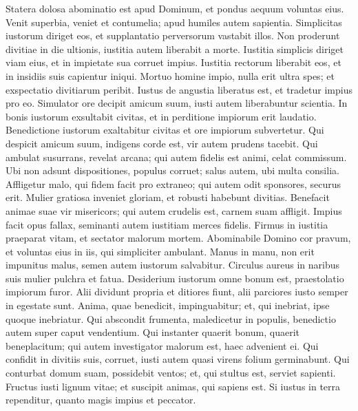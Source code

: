 \begin{biblechapter}
\begin{biblechapter}
\begin{biblechapter}
\begin{biblechapter}
\begin{biblechapter}
\begin{biblechapter}
\begin{biblechapter}
\begin{biblechapter}
\begin{biblechapter}
\begin{biblechapter}
\begin{biblechapter}
 \verse Statera dolosa abominatio est apud Dominum,
 et pondus aequum voluntas eius.
 \verse Venit superbia, veniet et contumelia;
 apud humiles autem sapientia.
 \verse Simplicitas iustorum diriget eos,
 et supplantatio perversorum vastabit illos.
 \verse Non proderunt divitiae in die ultionis,
 iustitia autem liberabit a morte.
 \verse Iustitia simplicis diriget viam eius,
 et in impietate sua corruet impius.
 \verse Iustitia rectorum liberabit eos,
 et in insidiis suis capientur iniqui.
 \verse Mortuo homine impio, nulla erit ultra spes;
 et exspectatio divitiarum peribit.
 \verse Iustus de angustia liberatus est,
 et tradetur impius pro eo.
 \verse Simulator ore decipit amicum suum,
 iusti autem liberabuntur scientia.
 \verse In bonis iustorum exsultabit civitas,
 et in perditione impiorum erit laudatio.
 \verse Benedictione iustorum exaltabitur civitas
 et ore impiorum subvertetur.
 \verse Qui despicit amicum suum, indigens corde est,
 vir autem prudens tacebit.
 \verse Qui ambulat susurrans, revelat arcana;
 qui autem fidelis est animi, celat commissum.
 \verse Ubi non adsunt dispositiones, populus corruet;
 salus autem, ubi multa consilia.
 \verse Affligetur malo, qui fidem facit pro extraneo;
 qui autem odit sponsores, securus erit.
 \verse Mulier gratiosa inveniet gloriam,
 et robusti habebunt divitias.
 \verse Benefacit animae suae vir misericors;
 qui autem crudelis est, carnem suam affligit.
 \verse Impius facit opus fallax,
 seminanti autem iustitiam merces fidelis.
 \verse Firmus in iustitia praeparat vitam,
 et sectator malorum mortem.
 \verse Abominabile Domino cor pravum,
 et voluntas eius in iis, qui simpliciter ambulant.
 \verse Manus in manu, non erit impunitus malus,
 semen autem iustorum salvabitur.
 \verse Circulus aureus in naribus suis
 mulier pulchra et fatua.
 \verse Desiderium iustorum omne bonum est,
 praestolatio impiorum furor.
 \verse Alii dividunt propria et ditiores fiunt,
 alii parciores iusto semper in egestate sunt.
 \verse Anima, quae benedicit, impinguabitur;
 et, qui inebriat, ipse quoque inebriatur.
 \verse Qui abscondit frumenta, maledicetur in populis,
 benedictio autem super caput vendentium.
 \verse Qui instanter quaerit bonum, quaerit beneplacitum;
 qui autem investigator malorum est, haec advenient ei.
 \verse Qui confidit in divitiis suis, corruet,
 iusti autem quasi virens folium germinabunt.
 \verse Qui conturbat domum suam, possidebit ventos;
 et, qui stultus est, serviet sapienti.
 \verse Fructus iusti lignum vitae;
 et suscipit animas, qui sapiens est.
 \verse Si iustus in terra rependitur,
 quanto magis impius et peccator.
 

\end{biblechapter}
\end{biblechapter}
\end{biblechapter}
\end{biblechapter}
\end{biblechapter}
\end{biblechapter}
\end{biblechapter}
\end{biblechapter}
\end{biblechapter}
\end{biblechapter}
\end{biblechapter}
